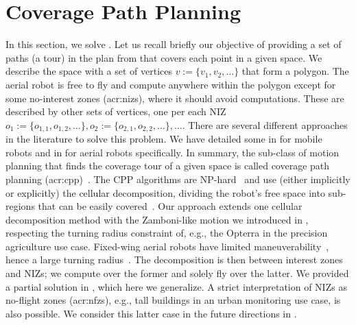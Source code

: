 

\section{Coverage Path Planning}
\label{sec:cov-path-plan}

In this section, we solve . Let us recall briefly our objective of providing a set of paths (a tour) in the plan from  that covers each point in a given space.  We describe the space with a set of vertices $v:=\{v_1,v_2,\dots\}$ that form a polygon. The aerial robot is free to fly and compute anywhere within the polygon except for some no-interest zones (\Gls{acr:niz}s),  where it should avoid computations. These are described by other sets of vertices, one per each NIZ $o_1:=\{o_{1,1},o_{1,2},\dots\},o_2:=\{o_{2,1},o_{2,2},\dots\},\dots$. There are several different approaches in the literature to solve this problem. We have detailed some in  for mobile robots and in  for aerial robots specifically. In summary, the sub-class of motion planning that finds the coverage tour of a given space is called coverage path planning (\Gls{acr:cpp})~\citep{choset1998coverage}. The CPP algorithms are NP-hard~\citep{arkin2000approximation} and use (either implicitly or explicitly) the cellular decomposition, dividing the robot's free space into sub-regions that can be easily covered~\citep{choset2001coverage,galceran2013survey}. Our approach extends one cellular decomposition method with the Zamboni-like motion we introduced in , respecting the turning radius constraint of, e.g., the Opterra in the precision agriculture use case. Fixed-wing aerial robots have limited maneuverability~\citep{mannadiar2010optimal,xu2011optimal,xu2014efficient}, hence a large turning radius~\citep{wang2017curvature}. The decomposition is then between interest zones and NIZs; we compute over the former and solely fly over the latter. We provided a partial solution in , which here we generalize.
A strict interpretation of NIZs as no-flight zones (\Gls{acr:nfz}s), e.g., tall buildings in an urban monitoring use case, is also possible. We consider this latter case in the future directions in .


